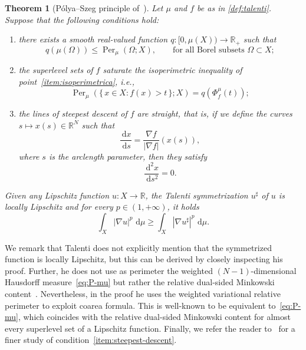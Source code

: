 \documentclass[a4paper,12pt,reqno]{amsart}
\numberwithin{equation}{section}
\newcommand{\R}{\mathbb{R}}
\newcommand{\Rn}{\mathbb{R}^N}
\renewcommand{\H}{\mathcal{H}}
\newcommand{\di}{\,\mathrm{d}}
\DeclareMathOperator{\Per}{Per}
\theoremstyle{plain}
\newtheorem{theorem}{Theorem}[section]
\theoremstyle{definition}
\begin{document}
\begin{theorem}[P\'olya--Szeg\H{o} principle of~\cite{Tal97}]
\label{thm:talenti}
%
Let $\mu$ and $f$ be as in \cref{def:talenti}. Suppose that the following conditions hold:
\begin{enumerate}[label=(\roman*), leftmargin = \parindent, align = left]
%
\item \label{item:isoperimetrica} there exists a smooth real-valued function $q:[0,\mu(X))\to\R_+$ such that
%
\[
q(\mu(\Omega)) \le \Per_\mu(\Omega; X), \qquad \text{for all Borel subsets } \Omega\subset X;
\]
%
\item \label{item:superlevelsets-f}
    the superlevel sets of $f$ saturate the isoperimetric inequality of point~\ref{item:isoperimetrica}, \emph{i.e.},
%
\begin{equation*}
\Per_\mu(\{\, x \in  X: f(x)>t\,\}; X) = q(\Phi_f^\mu(t)); 
\end{equation*}
%
\item \label{item:steepest-descent}
    the lines of steepest descent of $f$ are straight, that is, if we define the curves $s \mapsto x(s)\in \Rn$ such that
    \[
    \frac{\di x}{\di s} = \frac{\nabla f}{|\nabla f|}(x(s)),
    \]
    where $s$ is the arclength parameter, then they satisfy
    \[
    \frac{\di^2 x}{\di s^2} = 0.
    \]
%
\end{enumerate}
%
Given any Lipschitz function $u:X\to \R$, the Talenti symmetrization $u^\sharp$ of $u$ is locally Lipschitz and for every $p\in(1,+\infty)$, it holds
\begin{equation}
\label{eq:PS-Lip}
     \int_{X} |\nabla u|^p \, \di \mu 
    \geq \int_{X} |\nabla u^\sharp|^p \, \di \mu.
\end{equation}
\end{theorem}

We remark that Talenti does not explicitly mention that the symmetrized function is locally Lipschitz, but this can be derived by closely inspecting his proof. Further, he does not use as perimeter the weighted $(N-1)$-dimensional Hausdorff measure~\eqref{eq:P-mu} but rather the relative dual-sided Minkowski content~\cite[Eq.~(1.7)]{Tal97}. Nevertheless, in the proof he uses the weighted variational relative perimeter to exploit coarea formula. This is well-known to be equivalent to~\eqref{eq:P-mu}, which coincides with the relative dual-sided Minkowski content for almost every superlevel set of a Lipschitz function. Finally, we refer the reader to~\cite{Mag91} for a finer study of condition~\ref{item:steepest-descent}.
\end{document}
